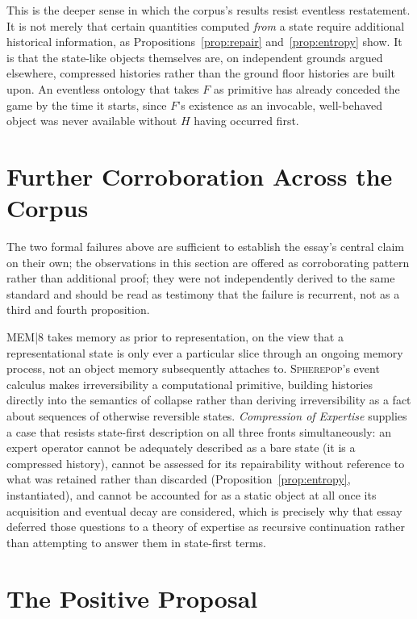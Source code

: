 \documentclass[11pt]{article}
\begin{document}
This is the deeper sense in which the corpus's results resist eventless restatement. It is not merely that certain quantities computed \emph{from} a state require additional historical information, as Propositions~\ref{prop:repair} and~\ref{prop:entropy} show. It is that the state-like objects themselves are, on independent grounds argued elsewhere, compressed histories rather than the ground floor histories are built upon. An eventless ontology that takes $F$ as primitive has already conceded the game by the time it starts, since $F$'s existence as an invocable, well-behaved object was never available without $H$ having occurred first.

\section{Further Corroboration Across the Corpus}

The two formal failures above are sufficient to establish the essay's central claim on their own; the observations in this section are offered as corroborating pattern rather than additional proof; they were not independently derived to the same standard and should be read as testimony that the failure is recurrent, not as a third and fourth proposition.

\textsc{MEM|8} takes memory as prior to representation, on the view that a representational state is only ever a particular slice through an ongoing memory process, not an object memory subsequently attaches to. \textsc{Spherepop}'s event calculus makes irreversibility a computational primitive, building histories directly into the semantics of collapse rather than deriving irreversibility as a fact about sequences of otherwise reversible states. \emph{Compression of Expertise} supplies a case that resists state-first description on all three fronts simultaneously: an expert operator cannot be adequately described as a bare state (it is a compressed history), cannot be assessed for its repairability without reference to what was retained rather than discarded (Proposition~\ref{prop:entropy}, instantiated), and cannot be accounted for as a static object at all once its acquisition and eventual decay are considered, which is precisely why that essay deferred those questions to a theory of expertise as recursive continuation rather than attempting to answer them in state-first terms.

\section{The Positive Proposal}
\end{document}
